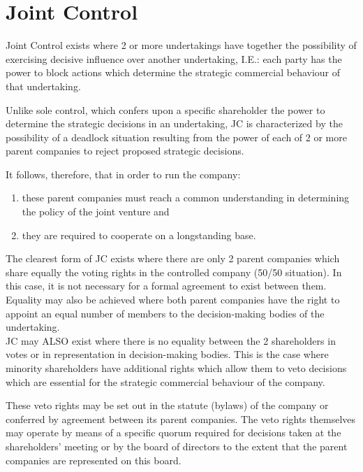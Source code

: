 \section{Joint Control}

    Joint Control exists where 2 or more undertakings have together the possibility of exercising decisive influence over another undertaking, I.E.: each party has the power to block actions which determine the strategic commercial behaviour of that undertaking.

    Unlike sole control, which confers upon a specific shareholder the power to determine the strategic decisions in an undertaking, JC is characterized by the possibility of a deadlock situation resulting from the power of each of 2 or more parent companies to reject proposed strategic decisions. 
    
    It follows, therefore, that in order to run the company:
    \begin{enumerate}
        \item these parent companies must reach a common understanding in determining the policy of the joint venture and
        \item they are required to cooperate on a longstanding base.
    \end{enumerate}

    The clearest form of JC exists where there are only 2 parent companies which share equally the voting rights in the controlled company (50/50 situation). In this case, it is not necessary for a formal agreement to exist between them. Equality may also be achieved where both parent companies have the right to appoint an equal number of members to the decision-making bodies of the undertaking. \\

    JC may ALSO exist where there is no equality between the 2 shareholders in votes or in representation in decision-making bodies. This is the case where minority shareholders have additional rights which allow them to veto decisions which are essential for the strategic commercial behaviour of the company. 
    
    These veto rights may be set out in the statute (bylaws) of the company or conferred by agreement between its parent companies. The veto rights themselves may operate by means of a specific quorum required for decisions taken at the shareholders' meeting or by the board of directors to the extent that the parent companies are represented on this board.

